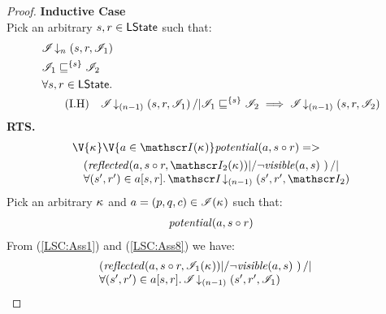 \begin{lemma}
\begin{proof}
\noindent\textbf{Inductive Case}\\
Pick an arbitrary $s, r \in \textsf{LState}$ such that:
\begin{align}
	&\extendsAMUpto{\lmod}{n}{s}{r}{\lmod_1} \label{LSC:Ass1}\\
	&\lmod_1 \weakenI{\{s\}} \lmod_2 \label{LSC:Ass2}\\
%		
	&	\for{s, r \in \LStates}  \nonumber\\
	& \tag{I.H} 
		\quad \extendsAMUpto{\lmod}{(n-1)}{s}{r}{\lmod_1} /| \lmod_1 \weakenI{\{s\}} \lmod_2 \implies \extendsAMUpto{\lmod}{(n-1)}{s}{r}{\lmod_2} \label{LSC:IH}
\end{align}
%
\textbf{RTS. } 
%
\begin{align}
  &\V{\ca{}}\V{a\in \lmod (\ca{})}
  \m{potential}(a,s \composeL r) =>\null \nonumber \\
  & \quad
  \begin{array}{@{} l @{}}
		\left(\m{reflected}(a,s \composeL r, \lmod_2(\ca{})) |/ \neg\m{visible}(a,s) \ \right) /| \\
		\for{(s', r') \in a[s, r]} \extendsAMUpto{\lmod}{(n-1)}{s'}{r'}{\lmod_2}
 	\end{array} \label{LSC:Goal3}
\end{align}
%
Pick an arbitrary $\kappa_{}$ and $a = (p, q, c) \in \mathscr{I}(\kappa_{})$ such that:
%
\begin{align}
	\mathit{potential}(a, s \circ r)\label{LSC:Ass8}
\end{align}
%
From (\ref{LSC:Ass1}) and (\ref{LSC:Ass8}) we have:
%
\begin{align}
	& \begin{array}{@{} l @{}}
		\left(\m{reflected}(a, s \composeL r, \lmod_1(\ca{})) |/ \neg\m{visible}(a, s) \ \right) /| \\
		\for{(s', r') \in a[s, r]} \extendsAMUpto{\lmod}{(n-1)}{s'}{r'}{\lmod_1}
	\end{array}

\end{align}
\end{proof}
\end{lemma}
